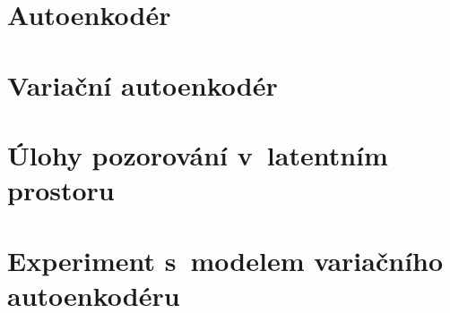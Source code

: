 \documentclass[11pt,a4paper]{report}
\begin{document}
\chapter{Autoenkodér}
\label{chap:autoencoder}
















\chapter{Variační autoenkodér}
\label{chap:vae}
















\chapter{Úlohy pozorování v~latentním prostoru}
\label{chap:applications}


\chapter{Experiment s~modelem variačního autoenkodéru}
\label{chap:experiments}









\end{document}
